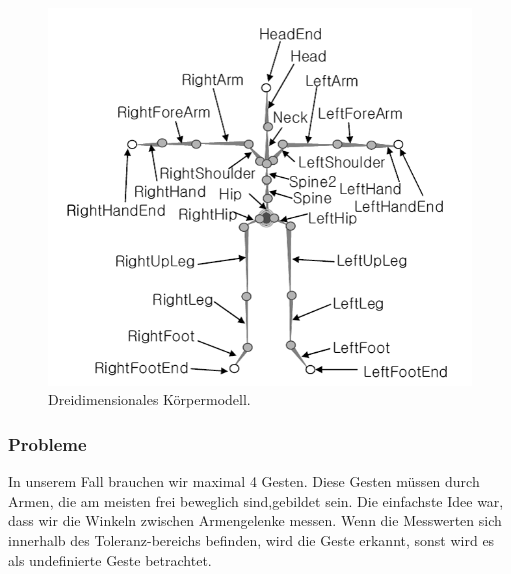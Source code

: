 \begin{figure}[h]
	\centering
	\includegraphics[scale=0.7]{graphics/BILD-Skelett.png}
	\caption{Dreidimensionales Körpermodell\cite{Hwang2006}.}
	\label{fig:gesten_skelett}
\end{figure}

\subsubsection{Probleme}
\authorsection{\editorhamza}
In unserem Fall brauchen wir maximal 4 Gesten. Diese Gesten müssen durch Armen, die am meisten frei beweglich sind,gebildet sein.  Die einfachste Idee war, dass wir die Winkeln  zwischen Armengelenke messen. Wenn die Messwerten sich  innerhalb des Toleranz-bereichs befinden, wird die Geste erkannt, sonst  wird es als undefinierte Geste betrachtet. 


